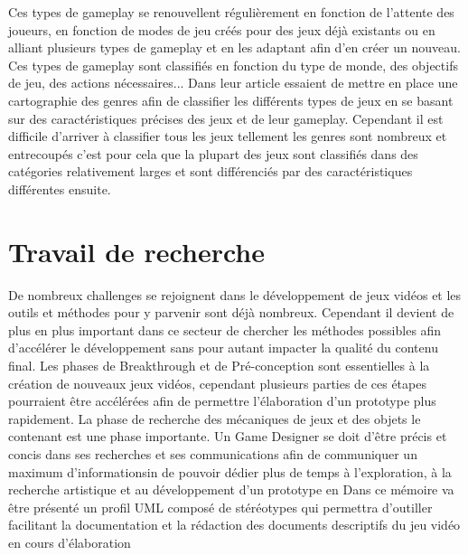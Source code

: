 Ces types de gameplay se renouvellent régulièrement en fonction de l'attente des joueurs, en fonction de modes de jeu créés pour des jeux déjà existants ou en alliant plusieurs types de gameplay et en les adaptant afin d'en créer un nouveau. Ces types de gameplay sont classifiés en fonction du type de monde, des objectifs de jeu, des actions nécessaires... Dans leur article \cite{HeintzStephanie2015TGGM} essaient de mettre en place une cartographie des genres afin de classifier les différents types de jeux en se basant sur des caractéristiques précises des jeux et de leur gameplay. Cependant il est difficile d'arriver à classifier tous les jeux tellement les genres sont nombreux et entrecoupés c'est pour cela que la plupart des jeux sont classifiés dans des catégories relativement larges et sont différenciés par des caractéristiques différentes ensuite.



\section{Travail de recherche}
De nombreux challenges se rejoignent dans le développement de jeux vidéos et les outils et méthodes pour y parvenir sont déjà nombreux. Cependant il devient de plus en plus important dans ce secteur de chercher les méthodes possibles afin d'accélérer le développement sans pour autant impacter la qualité du contenu final. Les phases de Breakthrough et de Pré-conception sont essentielles à la création de nouveaux jeux vidéos, cependant plusieurs parties de ces étapes pourraient être accélérées afin de permettre l'élaboration d'un prototype plus rapidement. La phase de recherche des mécaniques de jeux et des objets le contenant est une phase importante. Un Game Designer se doit d'être précis et concis dans ses recherches et ses communications afin de communiquer un maximum d'informationsin de pouvoir dédier plus de temps à l'exploration, à la recherche artistique et au développement d'un prototype en Dans ce mémoire va être présenté un profil UML composé de stéréotypes qui permettra d'outiller  facilitant la documentation et la rédaction des documents descriptifs du jeu vidéo en cours d'élaboration
 

